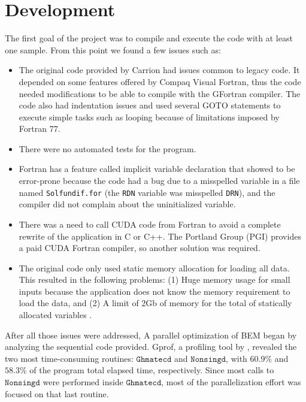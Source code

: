 \chapter{Development}
\label{cap:dev}

The first goal of the project was to compile and execute the code with at least one sample. 
From this point we found a few issues such as:

\begin{itemize}
\item The original code provided by Carrion had issues common to legacy code. 
It depended on some features offered by Compaq Visual Fortran, thus the code needed 
modifications to be able to compile with the GFortran compiler. The code also had 
indentation issues and used several GOTO statements to execute simple tasks such 
as looping because of limitations imposed by Fortran 77.

\item There were no automated tests for the program.

\item Fortran has a feature called implicit variable declaration that showed to be 
error-prone because the code had a bug due to a misspelled variable in a file 
named \texttt{Solfundif.for} (the \texttt{RDN} variable was misspelled \texttt{DRN}),
and the compiler did not complain about the uninitialized variable.

\item There was a need to call CUDA code from Fortran to avoid a complete rewrite of the 
application in C or C++. The Portland Group (PGI) provides a paid CUDA Fortran compiler,
so another solution was required.

\item The original code only used static memory allocation for loading all data. 
This resulted in the following problems: (1) Huge memory usage for small inputs because the 
application does not know the memory requirement to load the data, and (2) A limit of 2Gb of 
memory for the total of statically allocated variables \citep{intel_mcmodel:2010}. 

\end{itemize}


After all those issues were addressed, A parallel optimization of BEM began by analyzing the sequential code provided. 
Gprof, a profiling tool by \cite{binutils}, revealed the two most time-consuming routines: 
$\texttt{Ghmatecd}$ and $\texttt{Nonsingd}$, with $60.9\%$ and $58.3\%$ of the program total 
elapsed time, respectively.
Since most calls to $\texttt{Nonsingd}$ were performed inside $\texttt{Ghmatecd}$, most
of the parallelization effort was focused 
on that last routine.


